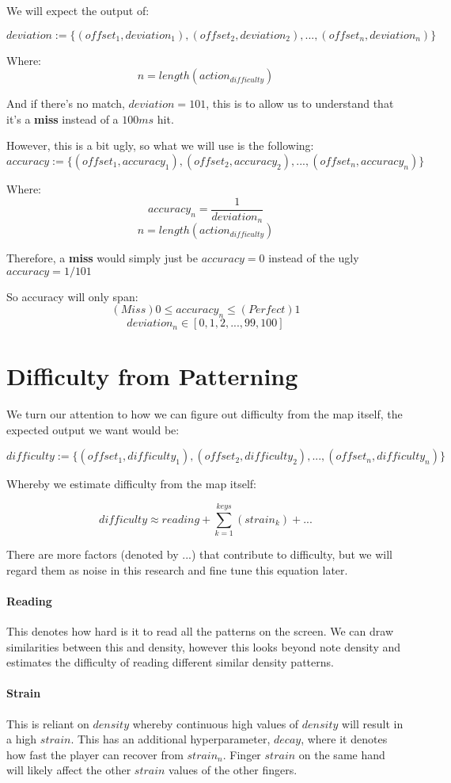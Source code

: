\documentclass{article}
\begin{document}
We will expect the output of:

$$ deviation := \lbrace(offset_1, deviation_1), (offset_2, deviation_2), ..., (offset_n, deviation_n)\rbrace $$

Where:
$$ n = length(action_{difficulty}) $$

And if there's no match, $deviation = 101$, this is to allow us to understand that it's a \textbf{miss} instead of a $100ms$ hit.

However, this is a bit ugly, so what we will use is the following:
$$ accuracy := \lbrace(offset_1, accuracy_1), (offset_2, accuracy_2), ..., (offset_n, accuracy_n)\rbrace $$

Where:
$$ accuracy_n = \frac{1}{deviation_n} $$
$$ n = length(action_{difficulty}) $$

Therefore, a \textbf{miss} would simply just be $accuracy = 0$ instead of the ugly $accuracy = 1/101$

So accuracy will only span:
$$ (Miss) 0 \leq accuracy_n \leq (Perfect) 1 $$
$$ deviation_n \in [0, 1, 2, ..., 99, 100] $$

\section{Difficulty from Patterning}

We turn our attention to how we can figure out difficulty from the map itself, the expected output we want would be:

$$ difficulty := \lbrace(offset_1, difficulty_1), (offset_2, difficulty_2), ..., (offset_n, difficulty_n)\rbrace $$

Whereby we estimate difficulty from the map itself:

$$ difficulty \approx reading + \sum_{k=1}^{keys} \left(strain_k \right) + ... $$

There are more factors (denoted by $...$) that contribute to difficulty, but we will regard them as noise in this research and fine tune this equation later.

\paragraph{Reading} This denotes how hard is it to read all the patterns on the screen. We can draw similarities between this and density, however this looks beyond note density and estimates the difficulty of reading different similar density patterns.

\paragraph{Strain} This is reliant on $density$ whereby continuous high values of $ density$ will result in a high $strain$. This has an additional hyperparameter, $decay$, where it denotes how fast the player can recover from $strain_n$. Finger $strain$ on the same hand will likely affect the other $strain$ values of the other fingers.
\end{document}
